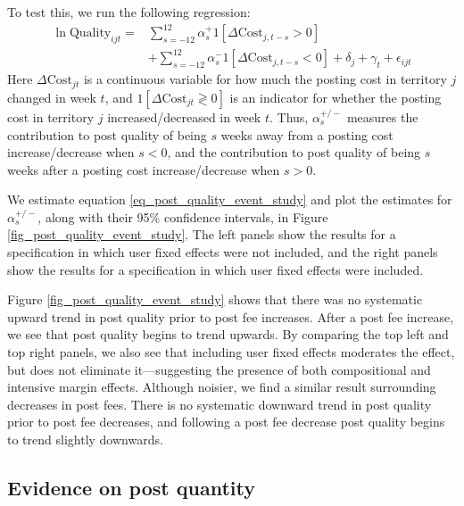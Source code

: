 To test this, we run the following regression:
\begin{align}
\ln \text{Quality}_{ijt} = & \sum_{s=-12}^{12} \alpha_{s}^{+} 1\left[ \Delta \text{Cost}_{j,t-s}>0 \right] \nonumber \\
& + \sum_{s=-12}^{12} \alpha_{s}^{-} 1\left[ \Delta \text{Cost}_{j,t-s} < 0 \right] + \delta_j + \gamma_t + \epsilon_{ijt} \label{eq_post_quality_event_study}
\end{align}
Here $\Delta\text{Cost}_{jt}$ is a continuous variable for how much the posting cost in territory $j$ changed in week $t$, and $1\left[\Delta\text{Cost}_{jt} \gtrless 0\right]$ is an indicator for whether the posting cost in territory $j$ increased/decreased in week $t$. Thus, $\alpha_{s}^{+/-}$ measures the contribution to post quality of being $s$ weeks away from a posting cost increase/decrease when $s<0$, and the contribution to post quality of being $s$ weeks after a posting cost increase/decrease when $s>0$. 

We estimate equation \eqref{eq_post_quality_event_study} and plot the estimates for $\alpha_{s}^{+/-}$, along with their 95\% confidence intervals, in Figure \ref{fig_post_quality_event_study}. The left panels show the results for a specification in which user fixed effects were not included, and the right panels show the results for a specification in which user fixed effects were included.

Figure \ref{fig_post_quality_event_study} shows that there was no systematic upward trend in post quality prior to post fee increases. After a post fee increase, we see that post quality begins to trend upwards. By comparing the top left and top right panels, we also see that including user fixed effects moderates the effect, but does not eliminate it---suggesting the presence of both compositional and intensive margin effects. Although noisier, we find a similar result surrounding decreases in post fees. There is no systematic downward trend in post quality prior to post fee decreases, and following a post fee decrease post quality begins to trend slightly downwards. 


\subsection{Evidence on post quantity}

